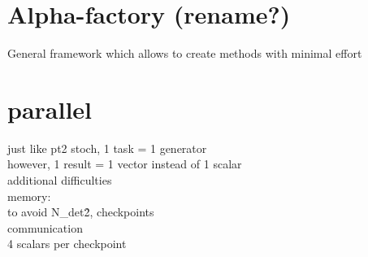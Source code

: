 \documentclass[./thesis.tex]{subfiles}
\begin{document}
\section{Alpha-factory (rename?)}


General framework which allows to create methods with minimal effort 

\section{parallel}
just like pt2 stoch, 1 task = 1 generator \\
however, 1 result = 1 vector instead of 1 scalar \\
additional difficulties \\
memory: \\
to avoid N\_det\^2, checkpoints \\
communication \\
4 scalars per checkpoint \\
\end{document}
